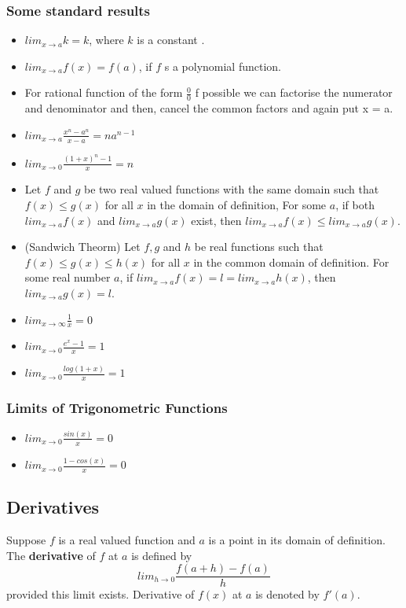 \documentclass[12pt]{article}
\begin{document}
\subsubsection*{Some standard results}
\begin{itemize}
    \item $lim_{x \rightarrow a} k = k $, where $k$ is a constant .
    \item $lim_{x \rightarrow a}f(x) = f(a)$, if $f$ s a polynomial function.
    \item For  rational function of the form $\frac{0}{0}$ f possible we can factorise the numerator and denominator and then, cancel the common factors and again put x = a. 
    \item $lim_{x \rightarrow a} \frac{x^n-a^n}{x-a}=na^{n-1}$
    \item $lim_{x \rightarrow 0} \frac{(1+x)^n - 1}{x}=n$
    \item Let $f$ and $g$ be two real valued functions with the same domain such that
   $ f (x) \leq g( x)$ for all $x$ in the domain of definition, For some $a$, if both $lim_{x \rightarrow a} f(x)$ and $lim_{x \rightarrow a} g(x)$ exist, then $lim_{x \rightarrow a} f(x) \leq lim_{x \rightarrow a} g(x)$.
   \item(Sandwich Theorm) Let $f, g$ and $h$ be real functions such that
   $f (x) \leq g( x) \leq h(x)$ for all $x$ in the common domain of definition. For some real number
   $a$, if $lim_{x \rightarrow a}f(x) = l = lim_{x \rightarrow a}
   h(x)$, then $lim_{x \rightarrow a} g(x) = l$.
   \item  $lim_{x \rightarrow \infty}\frac{1}{x}=0$
   \item  $lim_{x \rightarrow 0}\frac{e^x -1}{x}=1$
   \item $lim_{x \rightarrow 0} \frac{log(1+x)}{x}=1$
   
\end{itemize}

\subsubsection*{Limits of Trigonometric Functions}
\begin{itemize}
    \item $lim_{x \rightarrow 0}\frac{sin (x)}{x}=0$
    \item $lim_{x \rightarrow 0}\frac{1- cos (x)}{x}=0$
\end{itemize}

\subsection*{Derivatives}
Suppose $f$ is a real valued function and $a$ is a point in its domain of
definition. The \textbf{derivative} of $f$ at $a$ is defined by
$$lim_{h \rightarrow 0}\frac{f(a+h)-f(a)}{h}$$
provided this limit exists. Derivative of $f (x)$ at $a$ is denoted by $f'(a)$.
\end{document}
